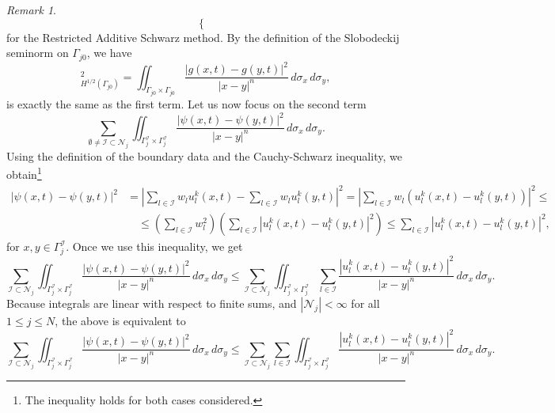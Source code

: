 \documentclass[a4paper, 11pt]{article}
\theoremstyle{remark}
\newtheorem{remark}[equation]{Remark}
\begin{document}
\begin{remark}
\begin{equation*}
\begin{cases}
        \end{cases}
    \end{equation*}
    for the Restricted Additive Schwarz method. By the definition of the Slobodeckij seminorm on $\Gamma_{j0}$, we have
    \begin{equation*}
        [g(\cdot, t)]^{2}_{H^{1/2}(\Gamma_{j0})} = \iint_{\Gamma_{j0} \times \Gamma_{j0}} \frac{|g(x, t) - g(y, t)|^2}{|x-y|^n} \, d\sigma_x \, d\sigma_y,
    \end{equation*}
    is exactly the same as the first term. Let us now focus on the second term
    \begin{equation*}
         \sum_{\emptyset\neq\mathcal{I}\subset\mathcal{N}_{j}} \iint_{\Gamma_j^{\mathcal{I}} \times \Gamma_j^{\mathcal{I}}} \frac{|\psi(x, t)-\psi(y, t)|^2}{|x-y|^n} \, d\sigma_x \, d\sigma_y.
    \end{equation*}
    Using the definition of the boundary data and the Cauchy-Schwarz inequality, we obtain\footnote{The inequality holds for both cases considered.}
    \begin{align*}
        |\psi(x, t)-\psi(y, t)|^2 &= \left|\sum_{l\in\mathcal{I}}w_{l}u_{l}^{k}(x, t) - \sum_{l\in\mathcal{I}}w_{l}u_{l}^{k}(y, t)\right|^{2} = \left|\sum_{l\in\mathcal{I}}w_{l}\left(u_{l}^{k}(x, t) - u_{l}^{k}(y, t)\right)\right|^{2} \leq\\
        &\quad \leq \left(\sum_{l\in\mathcal{I}}w_{l}^{2}\right)\left(\sum_{l\in\mathcal{I}}\left|u_{l}^{k}(x, t) - u_{l}^{k}(y, t)\right|^{2}\right) \leq \sum_{l\in\mathcal{I}}\left|u_{l}^{k}(x, t) - u_{l}^{k}(y, t)\right|^{2},
    \end{align*}
    for $x, y\in \Gamma_{j}^{\mathcal{I}}$. Once we use this inequality, we get
    \begin{equation*}
        \sum_{\mathcal{I}\subset\mathcal{N}_{j}} \iint_{\Gamma_j^{\mathcal{I}} \times \Gamma_j^{\mathcal{I}}} \frac{|\psi(x, t)-\psi(y, t)|^2}{|x-y|^n} \, d\sigma_x \, d\sigma_y \leq \sum_{\mathcal{I}\subset\mathcal{N}_{j}} \iint_{\Gamma_j^{\mathcal{I}} \times \Gamma_j^{\mathcal{I}}} \sum_{l\in\mathcal{I}}\frac{|u_{l}^{k}(x, t) - u_{l}^{k}(y, t)|^2}{|x-y|^n} \, d\sigma_x \, d\sigma_y.
    \end{equation*}
    Because integrals are linear with respect to finite sums, and $|\mathcal{N}_{j}| < \infty$ for all $1\leq j\leq N$, the above is equivalent to
    \begin{equation*}
        \sum_{\mathcal{I}\subset\mathcal{N}_{j}} \iint_{\Gamma_j^{\mathcal{I}} \times \Gamma_j^{\mathcal{I}}} \frac{|\psi(x, t)-\psi(y, t)|^2}{|x-y|^n} \, d\sigma_x \, d\sigma_y \leq \sum_{\mathcal{I}\subset\mathcal{N}_{j}} \sum_{l\in\mathcal{I}}\iint_{\Gamma_j^{\mathcal{I}} \times \Gamma_j^{\mathcal{I}}} \frac{|u_{l}^{k}(x, t) - u_{l}^{k}(y, t)|^2}{|x-y|^n} \, d\sigma_x \, d\sigma_y.

\end{equation*}
\end{remark}
\end{document}

